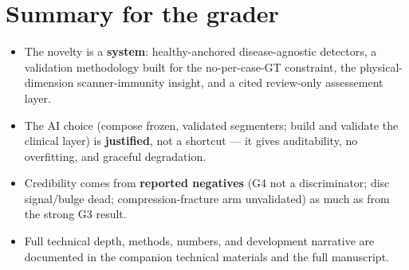 \documentclass[11pt]{article}
\begin{document}
\section{Summary for the grader}
\begin{itemize}
  \item The novelty is a \textbf{system}: healthy-anchored disease-agnostic detectors, a validation
  methodology built for the no-per-case-GT constraint, the physical-dimension scanner-immunity insight,
  and a cited review-only assessement layer.
  \item The AI choice (compose frozen, validated segmenters; build and validate the clinical layer) is
  \textbf{justified}, not a shortcut --- it gives auditability, no overfitting, and graceful degradation.
  \item Credibility comes from \textbf{reported negatives} (G4 not a discriminator; disc signal/bulge
  dead; compression-fracture arm unvalidated) as much as from the strong G3 result.
  \item Full technical depth, methods, numbers, and development narrative are documented in the
  companion technical materials and the full manuscript.
\end{itemize}
\end{document}
